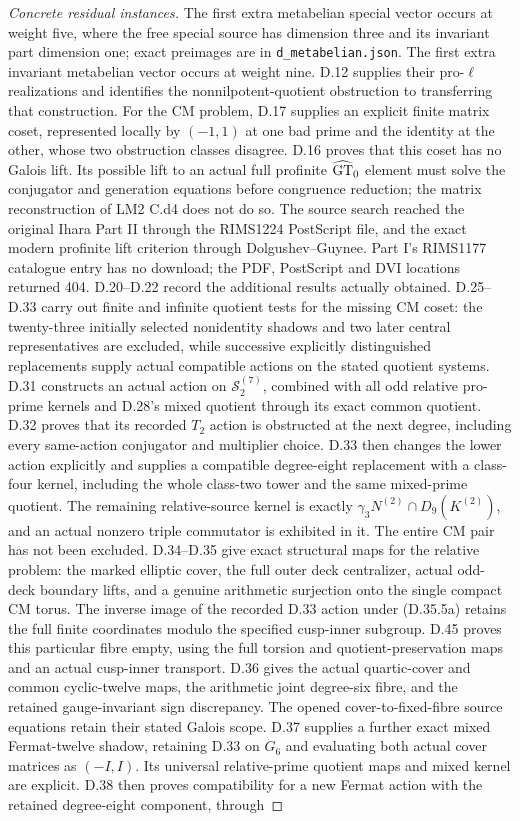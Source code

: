 \begin{proof}[Concrete residual instances]
The first extra metabelian special vector occurs at weight five, where the free special source has dimension three and its invariant part dimension one; exact preimages are in \texttt{d\_metabelian.json}. The first extra invariant metabelian vector occurs at weight nine. D.12 supplies their pro-$\ell$ realizations and identifies the nonnilpotent-quotient obstruction to transferring that construction. For the CM problem, D.17 supplies an explicit finite matrix coset, represented locally by $(-1,1)$ at one bad prime and the identity at the other, whose two obstruction classes disagree. D.16 proves that this coset has no Galois lift. Its possible lift to an actual full profinite $\widehat{\rm GT}_0$ element must solve the conjugator and generation equations before congruence reduction; the matrix reconstruction of LM2 C.d4 does not do so. The source search reached the original Ihara Part II through the RIMS1224 PostScript file, and the exact modern profinite lift criterion through Dolgushev--Guynee. Part I's RIMS1177 catalogue entry has no download; the PDF, PostScript and DVI locations returned 404. D.20--D.22 record the additional results actually obtained. D.25--D.33 carry out finite and infinite quotient tests for the missing CM coset: the twenty-three initially selected nonidentity shadows and two later central representatives are excluded, while successive explicitly distinguished replacements supply actual compatible actions on the stated quotient systems. D.31 constructs an actual action on $\mathcal S_2^{(7)}$, combined with all odd relative pro-prime kernels and D.28's mixed quotient through its exact common quotient. D.32 proves that its recorded $T_2$ action is obstructed at the next degree, including every same-action conjugator and multiplier choice. D.33 then changes the lower action explicitly and supplies a compatible degree-eight replacement with a class-four kernel, including the whole class-two tower and the same mixed-prime quotient. The remaining relative-source kernel is exactly $\gamma_3N^{(2)}\cap D_9(K^{(2)})$, and an actual nonzero triple commutator is exhibited in it. The entire CM pair has not been excluded. D.34--D.35 give exact structural maps for the relative problem: the marked elliptic cover, the full outer deck centralizer, actual odd-deck boundary lifts, and a genuine arithmetic surjection onto the single compact CM torus. The inverse image of the recorded D.33 action under (D.35.5a) retains the full finite coordinates modulo the specified cusp-inner subgroup. D.45 proves this particular fibre empty, using the full torsion and quotient-preservation maps and an actual cusp-inner transport. D.36 gives the actual quartic-cover and common cyclic-twelve maps, the arithmetic joint degree-six fibre, and the retained gauge-invariant sign discrepancy. The opened cover-to-fixed-fibre source equations retain their stated Galois scope. D.37 supplies a further exact mixed Fermat-twelve shadow, retaining D.33 on $G_6$ and evaluating both actual cover matrices as $(-I,I)$. Its universal relative-prime quotient maps and mixed kernel are explicit. D.38 then proves compatibility for a new Fermat action with the retained degree-eight component, through 
\end{proof}
